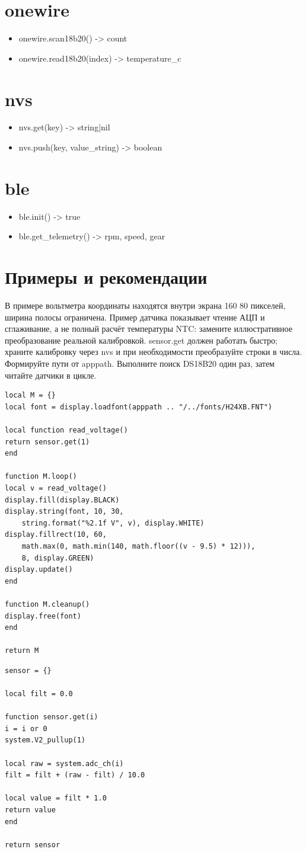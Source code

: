 \section{onewire}
\begin{itemize}
\item onewire.scan18b20() -> count
\item onewire.read18b20(index) -> temperature\_c
\end{itemize}
\section{nvs}
\begin{itemize}
\item nvs.get(key) -> string|nil
\item nvs.push(key, value\_string) -> boolean
\end{itemize}
\section{ble}
\begin{itemize}
\item ble.init() -> true
\item ble.get\_telemetry() -> rpm, speed, gear
\end{itemize}
\section{Примеры и рекомендации}
В примере вольтметра координаты находятся внутри экрана 160\,\texttimes\,80 пикселей, ширина полосы ограничена. Пример датчика показывает чтение АЦП и сглаживание, а не полный расчёт температуры NTC: замените иллюстративное преобразование реальной калибровкой. sensor.get должен работать быстро; храните калибровку через nvs и при необходимости преобразуйте строки в числа. Формируйте пути от apppath. Выполните поиск DS18B20 один раз, затем читайте датчики в цикле.
\begin{verbatim}
local M = {}
local font = display.loadfont(apppath .. "/../fonts/H24XB.FNT")

local function read_voltage()
return sensor.get(1)
end

function M.loop()
local v = read_voltage()
display.fill(display.BLACK)
display.string(font, 10, 30,
    string.format("%2.1f V", v), display.WHITE)
display.fillrect(10, 60,
    math.max(0, math.min(140, math.floor((v - 9.5) * 12))),
    8, display.GREEN)
display.update()
end

function M.cleanup()
display.free(font)
end

return M
\end{verbatim}
\begin{verbatim}
sensor = {}

local filt = 0.0

function sensor.get(i)
i = i or 0
system.V2_pullup(1)

local raw = system.adc_ch(i)
filt = filt + (raw - filt) / 10.0

local value = filt * 1.0
return value
end

return sensor
\end{verbatim}
